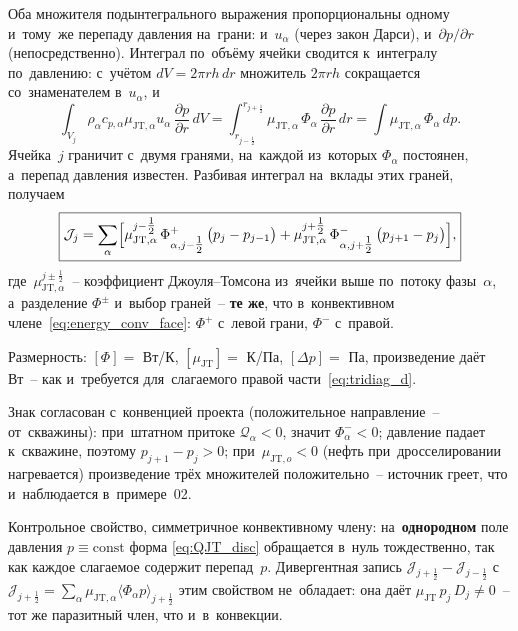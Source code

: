 \documentclass[12pt,a4paper]{article}
\newcommand{\half}{\tfrac{1}{2}}
\newcommand{\pdr}[1]{\frac{\partial #1}{\partial r}}
\begin{document}
Оба множителя подынтегрального выражения
пропорциональны одному и~тому~же перепаду давления на~грани:
и~$u_\alpha$ (через закон Дарси), и~$\partial p/\partial r$
(непосредственно). Интеграл по~объёму ячейки сводится к~интегралу
по~давлению: с~учётом $dV = 2\pi r h\,dr$ множитель $2\pi r h$
сокращается со~знаменателем в~$u_\alpha$, и
\begin{equation}\label{eq:QJT_integral}
  \int_{V_j}\!\rho_\alpha c_{p,\alpha}\mu_{\mathrm{JT},\alpha}
    u_\alpha\,\pdr{p}\,dV
  = \int_{r_{j-\half}}^{r_{j+\half}}\!\!
    \mu_{\mathrm{JT},\alpha}\,\Phi_\alpha\,\pdr{p}\,dr
  = \int \mu_{\mathrm{JT},\alpha}\,\Phi_\alpha\,dp .
\end{equation}
Ячейка~$j$ граничит с~двумя гранями, на~каждой из~которых
$\Phi_\alpha$ постоянен, а~перепад давления известен. Разбивая
интеграл на~вклады этих граней, получаем
\begin{equation}\label{eq:QJT_disc}
  \boxed{
    \mathcal{J}_j
    = \sum_\alpha\Bigl[
        \mu_{\mathrm{JT},\alpha}^{j-\half}\,\Phi_{\alpha,j-\half}^{+}\,
          \bigl(p_j - p_{j-1}\bigr)
      + \mu_{\mathrm{JT},\alpha}^{j+\half}\,\Phi_{\alpha,j+\half}^{-}\,
          \bigl(p_{j+1} - p_j\bigr)
      \Bigr],
  }
\end{equation}
где~$\mu_{\mathrm{JT},\alpha}^{j\pm\half}$~-- коэффициент
Джоуля--Томсона из~ячейки выше по~потоку фазы~$\alpha$, а~разделение
$\Phi^{\pm}$ и~выбор граней~-- \textbf{те же}, что
в~конвективном члене~\eqref{eq:energy_conv_face}: $\Phi^{+}$
с~левой грани, $\Phi^{-}$ с~правой.

Размерность: $[\Phi] = $ Вт/К, $[\mu_{\mathrm{JT}}] = $ К/Па,
$[\Delta p] = $ Па, произведение даёт Вт~-- как и~требуется
для~слагаемого правой части~\eqref{eq:tridiag_d}.

Знак согласован с~конвенцией проекта (положительное направление~--
от~скважины): при~штатном притоке $\mathcal{Q}_\alpha < 0$,
значит $\Phi_\alpha^{-} < 0$; давление падает к~скважине,
поэтому $p_{j+1} - p_j > 0$; при~$\mu_{\mathrm{JT},o} < 0$
(нефть при~дросселировании нагревается) произведение трёх множителей
положительно~-- источник греет, что и~наблюдается в~примере~02.

Контрольное свойство, симметричное конвективному члену:
на~\textbf{однородном} поле давления $p \equiv \mathrm{const}$ форма
\eqref{eq:QJT_disc} обращается в~нуль тождественно, так как каждое
слагаемое содержит перепад~$p$. Дивергентная запись
$\mathcal{J}_{j+\half} - \mathcal{J}_{j-\half}$ с~$\mathcal{J}_{j+\half}
= \sum_\alpha \mu_{\mathrm{JT},\alpha}\langle\Phi_\alpha p\rangle_{j+\half}$
этим свойством не~обладает: она даёт
$\mu_{\mathrm{JT}}\,p_j\,D_j \neq 0$~-- тот же паразитный член,
что и~в~конвекции.
\end{document}
